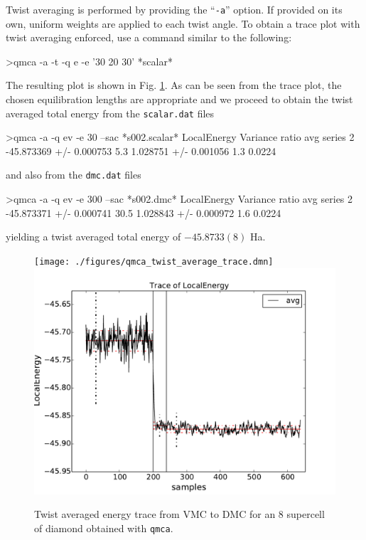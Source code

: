 Twist averaging is performed by providing the ``\texttt{-a}'' 
option.  If provided on its own, uniform weights are applied 
to each twist angle.  To obtain a trace plot with twist averaging 
enforced, use a command similar to the following:
\begin{shade}
>qmca -a -t -q e -e '30 20 30' *scalar*
\end{shade}
\noindent
The resulting plot is shown in Fig. \ref{fig:qmca_twist_average}.
As can be seen from the trace plot, the chosen equilibration lengths 
are appropriate and we proceed to obtain the twist averaged total energy
from the \texttt{scalar.dat} files
\begin{shade}
>qmca -a -q ev -e 30 --sac *s002.scalar*
                            LocalEnergy               Variance           ratio 
avg  series 2  -45.873369 +/- 0.000753    5.3   1.028751 +/- 0.001056    1.3   0.0224 
\end{shade}
\noindent
and also from the \texttt{dmc.dat} files
\begin{shade}
>qmca -a -q ev -e 300 --sac *s002.dmc*
                            LocalEnergy               Variance           ratio 
avg  series 2  -45.873371 +/- 0.000741   30.5   1.028843 +/- 0.000972    1.6   0.0224 
\end{shade}
\noindent
yielding a twist averaged total energy of $-45.8733(8)$ Ha. 

\begin{figure}
\begin{center}
\ifdefined\HCode
\texttt{[image: ./figures/qmca\_twist\_average\_trace.dmn]}
\else
\includegraphics[trim = 0mm 0mm 0mm 0mm, clip,width=0.75\columnwidth]{./figures/qmca_twist_average_trace.pdf}
\fi
\end{center}
\caption{Twist averaged energy trace from VMC to DMC for an 8 supercell of diamond obtained with \texttt{qmca}.}
\label{fig:qmca_twist_average}
\end{figure}

